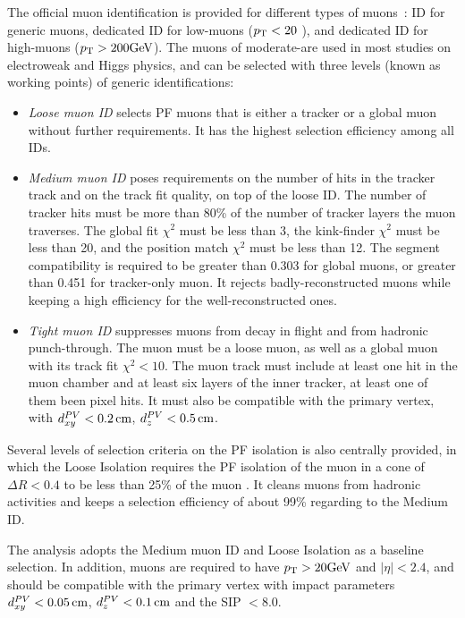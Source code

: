 The official muon identification is provided for different types of muons~\cite{Sirunyan_2018}: 
ID for generic muons, dedicated ID for low-\pt muons ($p_{\mathrm{T}} < 20$ \GeV), and dedicated ID for high-\pt muons ($p_{\mathrm{T}} > 200 \mbox{GeV}$).
The muons of moderate-\pt are used in most studies on electroweak and Higgs physics, 
and can be selected with three levels (known as working points) of generic identifications:
\begin{itemize}
    \item \textit{Loose muon ID}
          selects PF muons that is either a tracker or a global muon without further requirements.
          It has the highest selection efficiency among all IDs.
    \item \textit{Medium muon ID}
          poses requirements on the number of hits in the tracker track and on the track fit quality, on top of the loose ID.
          The number of tracker hits must be more than 80\% of the number of tracker layers the muon traverses.
          The global fit $\chi^{2}$ must be less than 3, the kink-finder $\chi^{2}$ must be less than 20, 
          and the position match $\chi^{2}$ must be less than 12.
          The segment compatibility is required to be greater than 0.303 for global muons, or greater than 0.451 for tracker-only muon.
          It rejects badly-reconstructed muons while keeping a high efficiency for the well-reconstructed ones.
    \item \textit{Tight muon ID}
          suppresses muons from decay in flight and from hadronic punch-through.
          The muon must be a loose muon, as well as a global muon with its track fit $\chi^{2} < 10$.
          The muon track must include at least one hit in the muon chamber and at least six layers of the inner tracker, at least one of them been pixel hits.
          It must also be compatible with the primary vertex, with $d^{PV}_{xy} < 0.2 \,\text{cm}$, $d^{PV}_{z} < 0.5 \,\text{cm}$.
\end{itemize}

Several levels of selection criteria on the PF isolation is also centrally provided, 
in which the Loose Isolation requires the PF isolation of the muon in a cone of $\Delta{}R < 0.4$ to be less than 25\% of the muon \pt.
It cleans muons from hadronic activities and keeps a selection efficiency of about 99\% regarding to the Medium ID.

The \hmm analysis adopts the Medium muon ID and Loose Isolation as a baseline selection.
In addition, muons are required to have $p_{\mathrm{T}} > 20 \mbox{GeV}$ and $|\eta| < 2.4$,
and should be compatible with the primary vertex with impact parameters
$d^{PV}_{xy} < 0.05 \,\text{cm}$, $d^{PV}_{z} < 0.1 \,\text{cm}$ and the SIP $< 8.0$. 

